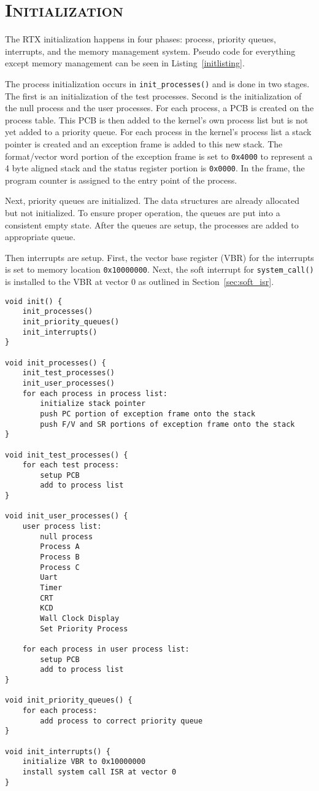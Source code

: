 \documentclass[oneside]{report}
\begin{document}
\pagebreak

\section{\textsc{Initialization}}
\label{sec:rtx_init}
The RTX initialization happens in four phases: process, priority queues, 
interrupts, and the memory management system. Pseudo code for everything except
memory management can be seen in Listing~\ref{initlisting}.

The process initialization occurs in \texttt{init\_processes()} and is done in
two stages. The first is an initialization of the test processes. Second is the
initialization of the null process and the user processes. For each process, a
PCB is created on the process table. This PCB is then added to the kernel's own
process list but is not yet added to a priority queue. For each process in
the kernel's process list a stack pointer is created and an exception frame is
added to this new stack. The format/vector word portion of the exception frame
is set to \texttt{0x4000} to represent a 4 byte aligned stack and the status register
portion is \texttt{0x0000}. In the frame, the program counter is assigned to the entry
point of the process.

Next, priority queues are initialized. The data structures are already
allocated but not initialized. To ensure proper operation, the queues are
put into a consistent empty state. After the queues are setup, the processes
are added to appropriate queue.

Then interrupts are setup. First, the vector base register (VBR) for the
interrupts is set to memory location \texttt{0x10000000}. Next, the soft interrupt for
\texttt{system\_call()} is installed to the VBR at vector 0 as outlined in
Section~\ref{sec:soft_isr}.

\begin{lstlisting}
void init() {
    init_processes()
    init_priority_queues()
    init_interrupts()
}

void init_processes() {
    init_test_processes()
    init_user_processes()
    for each process in process list:
        initialize stack pointer
        push PC portion of exception frame onto the stack
        push F/V and SR portions of exception frame onto the stack
}

void init_test_processes() {
    for each test process: 
        setup PCB
        add to process list
}

void init_user_processes() {
    user process list:
        null process
        Process A
        Process B
        Process C
        Uart
        Timer
        CRT
        KCD
        Wall Clock Display
        Set Priority Process

    for each process in user process list:
        setup PCB
        add to process list
}

void init_priority_queues() {
    for each process: 
        add process to correct priority queue
}

void init_interrupts() {
    initialize VBR to 0x10000000
    install system call ISR at vector 0
}
\end{lstlisting}
\end{document}

